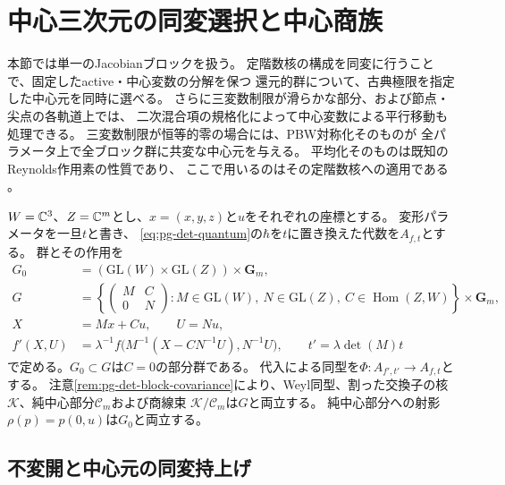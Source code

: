\section{中心三次元の同変選択と中心商族}
\label{sec:pg-equivariant-central-lifts}
本節では単一のJacobianブロックを扱う。
定階数核の構成を同変に行うことで、固定したactive・中心変数の分解を保つ
還元的群について、古典極限を指定した中心元を同時に選べる。
さらに三変数制限が滑らかな部分、および節点・尖点の各軌道上では、
二次混合項の規格化によって中心変数による平行移動も処理できる。
三変数制限が恒等的零の場合には、PBW対称化そのものが
全パラメータ上で全ブロック群に共変な中心元を与える。
平均化そのものは既知のReynolds作用素の性質であり、
ここで用いるのはその定階数核への適用である
\cite[\S2, p.~369]{PDerksenInvariants}。

$W=\mathbb C^3$、$Z=\mathbb C^m$とし、$x=(x,y,z)$と$u$をそれぞれの座標とする。
変形パラメータを一旦$t$と書き、
\eqref{eq:pg-det-quantum}の$\hbar$を$t$に置き換えた代数を$A_{f,t}$とする。
群とその作用を
\begin{equation}
 \begin{aligned}
 G_0&=(\mathrm{GL}(W)\times\mathrm{GL}(Z))\times\mathbf G_m,\\
 G&=\left\{
 \begin{pmatrix}M&C\\0&N\end{pmatrix}
 :M\in\mathrm{GL}(W),\ N\in\mathrm{GL}(Z),\ C\in\operatorname{Hom}(Z,W)
 \right\}\times\mathbf G_m,\\
 X&=Mx+Cu,\qquad U=Nu,\\
 f'(X,U)&=\lambda^{-1}
 f\bigl(M^{-1}(X-CN^{-1}U),N^{-1}U\bigr),\qquad
 t'=\lambda\det(M)t
 \end{aligned}
 \label{eq:pg-equivariant-groups}
\end{equation}
で定める。$G_0\subset G$は$C=0$の部分群である。
代入による同型を$\Phi:A_{f',t'}\to A_{f,t}$とする。
注意\ref{rem:pg-det-block-covariance}により、Weyl同型、割った交換子の核
$\mathcal K$、純中心部分$\mathcal C_m$および商線束
$\mathcal K/\mathcal C_m$は$G$と両立する。
純中心部分への射影$\rho(p)=p(0,u)$は$G_0$と両立する。

\subsection{不変開と中心元の同変持上げ}

